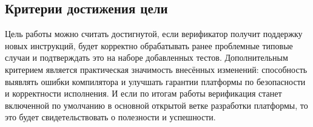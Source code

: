 \subsection{Критерии достижения цели}

Цель работы можно считать достигнутой, если верификатор получит поддержку новых инструкций,
будет корректно обрабатывать ранее проблемные типовые случаи и подтверждать это на наборе добавленных тестов. 
Дополнительным критерием является практическая значимость внесённых
изменений: способность выявлять ошибки компилятора и улучшать гарантии платформы по безопасности и
корректности исполнения. И если по итогам работы верификация станет включенной по умолчанию в основной открытой ветке
разработки платформы, то это будет свидетельствовать о полезности и успешности.
